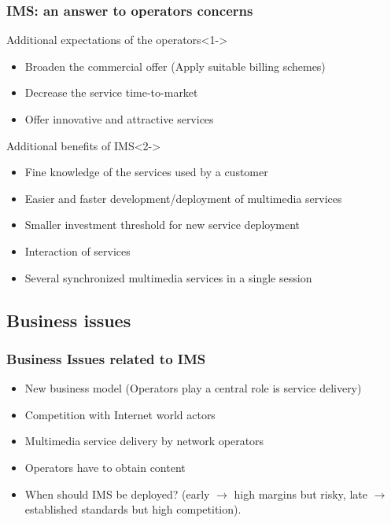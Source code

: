 \documentclass[pdf]{beamer}
\begin{document}
    \begin{frame}
        \frametitle{IMS: an answer to operators concerns}
     \begin{block}{Additional expectations of the operators}<1->
            \begin{itemize} 
                \item Broaden the commercial offer (Apply suitable billing schemes)
                \item Decrease the service time-to-market
                \item Offer innovative and attractive services
            \end{itemize} 
        \end{block}
                       
     \begin{block}{Additional benefits of IMS}<2->           
            \begin{itemize}
                \item Fine knowledge of the services used by a customer
                \item Easier and faster development/deployment of multimedia services
                \item Smaller investment threshold for new service deployment             
                \item Interaction of services
                \item Several synchronized multimedia services in a single session

            \end{itemize} 
        \end{block}
    \end{frame}   
   \subsection{Business issues}
    \begin{frame}
        \frametitle{Business Issues related to IMS}
        \begin{itemize}
            \item<+-> New business model (Operators play a central role is service delivery)
            \item<+->[$\Rightarrow$] Competition with Internet world actors
            \item<+-> Multimedia service delivery by network operators
            \item<+->[$\Rightarrow$] Operators have to obtain content
            \item<+-> When should IMS be deployed? (early $\rightarrow$ high margins but risky, late  $\rightarrow$ established standards but high competition).
        \end{itemize}         
    \end{frame}   
       
\end{document}
